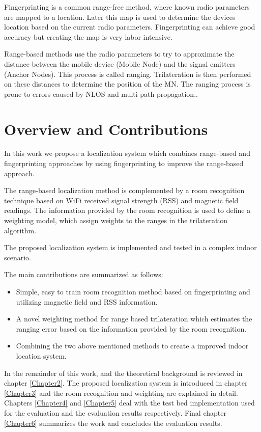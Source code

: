 Fingerprinting is a common range-free method, where known radio parameters are mapped to a location. Later this map is used to determine the devices location based on the current radio parameters. Fingerprinting can achieve good accuracy but creating the map is very labor intensive\cite{FineGrainedIndoorTracking}.

Range-based methods use the radio parameters to try to approximate the distance between the mobile device (Mobile Node) and the signal emitters (Anchor Nodes). This process is called ranging. Trilateration is then performed on these distances to determine the position of the MN. The ranging process is prone to errors caused by NLOS and multi-path propagation.\cite{FineGrainedIndoorTracking}.

\section{Overview and Contributions}

In this work we propose a localization system which combines range-based and fingerprinting approaches by using fingerprinting to improve the range-based approach.

The range-based localization method is complemented by a room recognition technique based on WiFi received signal strength (RSS) and magnetic field readings. The information provided by the room recognition is used to define a weighting model, which assign weights to the ranges in the trilateration algorithm.

The proposed localization system is implemented and tested in a complex indoor scenario.

The main contributions are summarized as follows:
\begin{itemize}
\item Simple, easy to train room recognition method based on fingerprinting and utilizing magnetic field and RSS information.
\item A novel weighting method for range based trilateration which estimates the ranging error based on the information provided by the room recognition.
\item Combining the two above mentioned methods to create a improved indoor location system.
\end{itemize}

In the remainder of this work, and the theoretical background is reviewed in chapter \ref{Chapter2}. The proposed localization system is introduced in chapter \ref{Chapter3} and the room recognition and weighting are explained in detail. Chapters \ref{Chapter4} and \ref{Chapter5} deal with the test bed implementation used for the evaluation and the evaluation results respectively. Final chapter \ref{Chapter6} summarizes the work and concludes the evaluation results.
